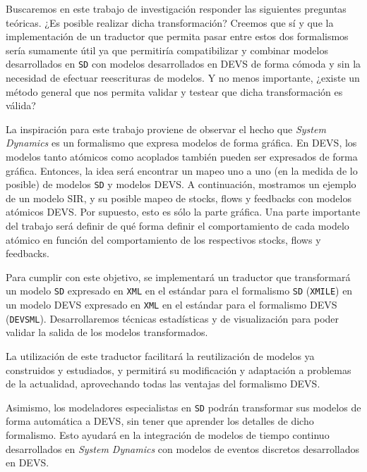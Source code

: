Buscaremos en este trabajo de investigación responder las siguientes preguntas teóricas.
¿Es posible realizar dicha transformación? Creemos que sí y que la implementación de un traductor que permita pasar entre estos dos formalismos sería sumamente útil ya que permitiría compatibilizar y combinar modelos desarrollados en \texttt{SD} con modelos desarrollados en DEVS de forma cómoda y sin la necesidad de efectuar reescrituras de modelos.
Y no menos importante, ¿existe un método general que nos permita validar y testear que dicha transformación es válida?

La inspiración para este trabajo proviene de observar el hecho que \textit{System Dynamics} es un formalismo que expresa modelos de forma gráfica. En DEVS, los modelos tanto atómicos como acoplados también pueden ser expresados de forma gráfica. Entonces, la idea será encontrar un mapeo uno a uno (en la medida de lo posible) de modelos \texttt{SD} y modelos DEVS. A continuación, mostramos un ejemplo de un modelo SIR, y su posible mapeo de stocks, flows y feedbacks con modelos atómicos DEVS. Por supuesto, esto es sólo la parte gráfica. Una parte importante del trabajo será definir de qué forma definir el comportamiento de cada modelo atómico en función del comportamiento de los respectivos stocks, flows y feedbacks.

Para cumplir con este objetivo, se implementará un traductor que transformará un modelo \texttt{SD} expresado en \texttt{XML} en el estándar para el formalismo \texttt{SD} (\texttt{XMILE}) en un modelo DEVS expresado en \texttt{XML} en el estándar para el formalismo DEVS (\texttt{DEVSML}).
Desarrollaremos técnicas estadísticas y de visualización para poder validar la salida de los modelos transformados.

La utilización de este traductor facilitará la reutilización de modelos ya construidos y estudiados, y permitirá su modificación y adaptación a problemas de la actualidad, aprovechando todas las ventajas del formalismo DEVS.

Asimismo, los modeladores especialistas en \texttt{SD} podrán transformar sus modelos de forma automática a DEVS, sin tener que aprender los detalles de dicho formalismo. Esto ayudará en la integración de modelos de tiempo continuo desarrollados en \textit{System Dynamics} con modelos de eventos discretos desarrollados en DEVS.



